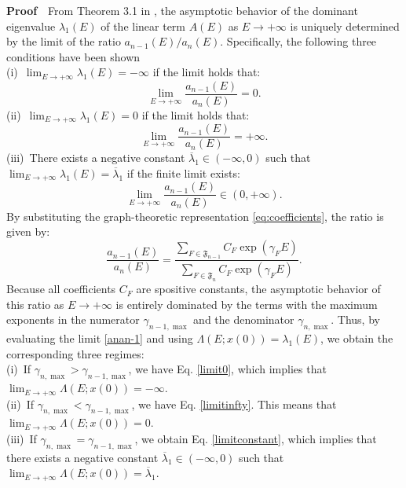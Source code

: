 \documentclass[11pt,a4paper]{article}
\begin{document}
\noindent
{\bf Proof}~~From Theorem 3.1 in \cite{Komatsu-Ooka}, the asymptotic behavior of the dominant eigenvalue $\lambda_1(E)$ of the linear term $A(E)$ as $E \to +\infty$ is uniquely determined by the limit of the ratio $a_{n-1}(E)/a_n(E)$. Specifically, the following three conditions have been  shown\\[0.1cm] \noindent
(i)~$\lim_{E \to +\infty}\lambda_1(E) = -\infty$ if the limit holds that:
\begin{equation}
\lim_{E \to +\infty}\frac{a_{n-1}(E)}{a_n(E)} = 0.\label{limit0}
\end{equation}
\noindent
(ii)~$\lim_{E \to +\infty}\lambda_1(E) = 0$ if the limit holds that:
\begin{equation}
\lim_{E \to +\infty}\frac{a_{n-1}(E)}{a_n(E)} = +\infty.\label{limitinfty}
\end{equation}
\noindent
(iii)~There exists a negative constant ${\overline \lambda}_1 \in (-\infty, 0)$ such that $\lim_{E \to +\infty}\lambda_1(E) = {\overline \lambda}_1$ if the finite limit exists:
\begin{equation}
\lim_{E \to +\infty}\frac{a_{n-1}(E)}{a_n(E)} \in (0, +\infty).\label{limitconstant}
\end{equation}
By substituting the graph-theoretic representation \eqref{eq:coefficients}, the ratio is given by:
\begin{equation}
\frac{a_{n-1}(E)}{a_n(E)} = \frac{\sum_{F \in \mathfrak{F}_{n-1}} C_F \exp(\gamma_F E)}{\sum_{F \in \mathfrak{F}_n} C_F \exp(\gamma_F E)}.\label{anan-1}
\end{equation}
Because all coefficients $C_F$ are spositive constants, the asymptotic behavior of this ratio as $E \to +\infty$ is entirely dominated by the terms with the maximum exponents in the numerator $\gamma_{n-1, \max}$ and the denominator $\gamma_{n, \max}$. Thus, by evaluating the limit \eqref{anan-1} and using $\Lambda(E;x(0)) = \lambda_1(E)$, we obtain the corresponding three regimes:\\[0.1cm] \noindent
(i)~If $\gamma_{n, \max} > \gamma_{n-1, \max}$, we have Eq. \eqref{limit0}, which implies that  $\lim_{E \to +\infty}\Lambda(E;x(0)) = -\infty$.\\[0.1cm] \noindent
(ii)~If $\gamma_{n, \max} < \gamma_{n-1, \max}$, we have Eq. \eqref{limitinfty}. This means that $\lim_{E \to +\infty}\Lambda(E;x(0)) = 0$.\\[0.1cm] \noindent
(iii)~If $\gamma_{n, \max} = \gamma_{n-1, \max}$, we obtain Eq. \eqref{limitconstant}, which implies that there exists a negative constant ${\overline \lambda}_1 \in (-\infty, 0)$ such that $\lim_{E \to +\infty}\Lambda(E;x(0)) = {\overline \lambda}_1$.\\[0.2cm]
\end{document}
